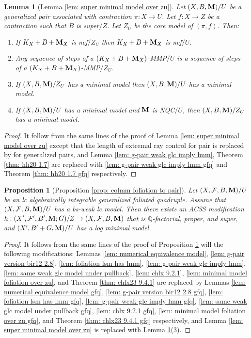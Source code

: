 \documentclass[11pt]{amsart}
\numberwithin{equation}{section}
\newcommand{\Mm}{{\bf{M}}}
\newcommand{\Qq}{\mathbb{Q}}
\newcommand{\Ff}{\mathcal{F}}
\newtheorem{lem}[thm]{Lemma}
\newtheorem{prop}[thm]{Proposition}
\theoremstyle{definition}
\theoremstyle{definition}
\theoremstyle{definition}
\begin{document}
\begin{lem}[Lemma \ref{lem: super minimal model over zu}]\label{lem: super minimal model over zu gfq}
    Let $(X,B,\Mm)/U$ be a generalized pair associated with contraction $\pi: X\rightarrow U$. Let $f: X\rightarrow Z$ be a contraction such that $B$ is super$/Z$. Let $Z_U$ be the core model of $(\pi,f)$. Then:
    \begin{enumerate}
    \item If $K_X+B+\Mm_X$ is nef$/Z_U$ then $K_X+B+\Mm_X$ is nef$/U$.
    \item Any sequence of steps of a $(K_X+B+\Mm_X)$-MMP$/U$ is a sequence of steps of a $(K_X+B+\Mm_X)$-MMP$/Z_U$.
    \item If $(X,B,\Mm)/Z_U$ has a minimal model then $(X,B,\Mm)/U$ has a minimal model.
    \item If $(X,B,\Mm)/U$ has a minimal model and $\Mm$ is NQC$/U$, then $(X,B,\Mm)/Z_U$ has a minimal model.
    \end{enumerate}
\end{lem}
\begin{proof}
It follow from the same lines of the proof of  Lemma \ref{lem: super minimal model over zu} except that the length of extremal ray control for pair is replaced by \cite[Theorem 2.2.1(2)]{CHLX23} for generalized pairs, and Lemma \ref{lem: g-pair weak glc imply lmm}, Theorem \ref{thm: hh20 1.7} are replaced with \ref{lem: g-pair weak glc imply lmm gfq} and Theorem \ref{thm: hh20 1.7 gfq} respectively.
\end{proof}

\begin{prop}[Proposition \ref{prop: eolmm foliation to pair}]\label{prop: eolmm foliation to pair gfq}
    Let $(X,\Ff,B,\Mm)/U$ be an lc algebraically integrable generalized foliated quadruple. Assume that $(X,\Ff,B,\Mm)/U$ has a bs-weak lc model. Then there exists an ACSS modification $h: (X',\Ff',B',\Mm;G)/Z\rightarrow (X,\Ff,B,\Mm)$ that is $\Qq$-factorial, proper, and super, and $(X',B'+G,\Mm)/U$ has a log minimal model.
\end{prop}
\begin{proof}
    It follows from the same lines of the proof of Proposition \ref{prop: eolmm foliation to pair gfq} will the following modifications: Lemmas \ref{lem: numerical equivalence model}, \ref{lem: g-pair version bir12 2.8}, \ref{lem: foliation lsm has lmm}, \ref{lem: g-pair weak glc imply lmm}, \ref{lem: same weak glc model under pullback}, \ref{lem: chlx 9.2.1}, \ref{lem: minimal model foliation over zu}, and Theorem \ref{thm: chlx23 9.4.1} are replaced by Lemmas \ref{lem: numerical equivalence model gfq}, \ref{lem: g-pair version bir12 2.8 gfq}, \ref{lem: foliation lsm has lmm gfq}, \ref{lem: g-pair weak glc imply lmm gfq},  \ref{lem: same weak glc model under pullback gfq}, \ref{lem: chlx 9.2.1 gfq}, \ref{lem: minimal model foliation over zu gfq}, and Theorem \ref{thm: chlx23 9.4.1 gfq} respectively, and Lemma \ref{lem: super minimal model over zu} is replaced with Lemma \ref{lem: super minimal model over zu gfq}(3).
\end{proof}
\end{document}
